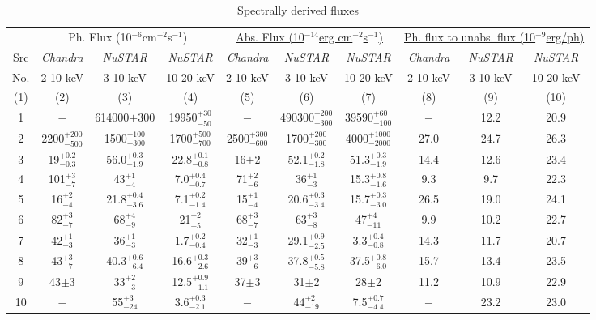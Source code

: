 \documentclass[iop,revtex4]{emulateapj}
\newcommand\T{\rule{0pt}{2.6ex}}       %
\newcommand\B{\rule[-1.2ex]{0pt}{0pt}} %
\newcommand\M{\rule{0pt}{2.3ex}}
\begin{document}
\begin{table}
\begin{minipage}{\linewidth}
\begin{adjustwidth}{-0.9in}{-0.9in}
\centering
\footnotesize
\begin{threeparttable}
\caption{Spectrally derived fluxes}
\begin{tabular}{cccccccccc} \hline \hline
\T &\multicolumn{3}{c}{Ph. Flux (10$^{-6}$cm$^{-2}$s$^{-1}$)}&\multicolumn{3}{c}{\underline{Abs. Flux (10$^{-14}$erg cm$^{-2}$s$^{-1}$)}}&\multicolumn{3}{c}{\underline{Ph. flux to unabs. flux (10$^{-9}$erg/ph)}}\\ \cline{2-4} %
\T Src&\textit{Chandra}&\textit{NuSTAR}&\textit{NuSTAR}&\textit{Chandra}&\textit{NuSTAR}&\textit{NuSTAR}&\textit{Chandra}&\textit{NuSTAR}&\textit{NuSTAR}\\
No.&2-10 keV&3-10 keV&10-20 keV&2-10 keV&3-10 keV&10-20 keV&2-10 keV&3-10 keV&10-20 keV\\
\B(1)&(2)&(3)&(4)&(5)&(6)&(7)&(8)&(9)&(10)\\
\hline
\T 1&$-$&614000$\pm$300&19950$^{+30}_{-50}$&$-$&490300$^{+200}_{-300}$&39590$^{+60}_{-100}$&$-$&12.2&20.9\\
\M 2&2200$^{+200}_{-500}$&1500$^{+100}_{-300}$&1700$^{+500}_{-700}$&2500$^{+300}_{-600}$&1700$^{+200}_{-300}$&4000$^{+1000}_{-2000}$&27.0&24.7&26.3\\
\M 3&19$^{+0.2}_{-0.3}$&56.0$^{+0.3}_{-1.9}$&22.8$^{+0.1}_{-0.8}$&16$\pm$2&52.1$^{+0.2}_{-1.8}$&51.3$^{+0.3}_{-1.9}$&14.4&12.6&23.4\\
\M 4&101$^{+3}_{-7}$&43$^{+1}_{-4}$&7.0$^{+0.4}_{-0.7}$&71$^{+2}_{-6}$&36$^{+1}_{-3}$&15.3$^{+0.8}_{-1.6}$&9.3&9.7&22.3\\
\M 5&16$^{+2}_{-4}$&21.8$^{+0.4}_{-3.6}$&7.1$^{+0.2}_{-1.4}$&15$^{+1}_{-4}$&20.6$^{+0.3}_{-3.4}$&15.7$^{+0.3}_{-3.0}$&26.5&19.0&24.1\\
\M 6&82$^{+3}_{-7}$&68$^{+4}_{-9}$&21$^{+2}_{-5}$&68$^{+3}_{-7}$&63$^{+3}_{-8}$&47$^{+4}_{-11}$&9.9&10.2&22.7\\
\M 7&42$^{+1}_{-3}$&36$^{+1}_{-3}$&1.7$^{+0.2}_{-0.4}$&32$^{+1}_{-3}$&29.1$^{+0.9}_{-2.5}$&3.3$^{+0.4}_{-0.8}$&14.3&11.7&20.7\\
\M 8&43$^{+3}_{-7}$&40.3$^{+0.6}_{-6.4}$&16.6$^{+0.3}_{-2.6}$&39$^{+3}_{-6}$&37.8$^{+0.5}_{-5.8}$&37.5$^{+0.8}_{-6.0}$&15.7&13.4&23.5\\
\M 9&43$\pm$3&33$^{+2}_{-3}$&12.5$^{+0.9}_{-1.1}$&37$\pm$3&31$\pm$2&28$\pm$2&11.2&10.9&22.9\\
\M 10&$-$&55$^{+3}_{-24}$&3.6$^{+0.3}_{-2.1}$&$-$&44$^{+2}_{-19}$&7.5$^{+0.7}_{-4.4}$&$-$&23.2&23.0\\

\end{tabular}
\end{threeparttable}
\end{adjustwidth}
\end{minipage}
\end{table}
\end{document}

